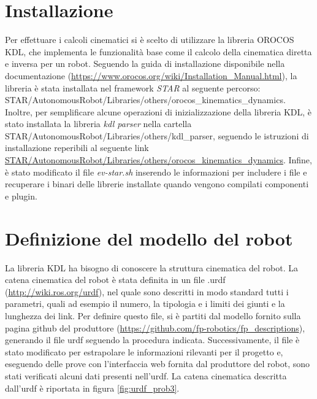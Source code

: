 \section{Installazione}
Per effettuare i calcoli cinematici si è scelto di utilizzare la libreria OROCOS KDL, che implementa le funzionalità base come il calcolo della cinematica diretta e inversa per un robot. Seguendo la guida di installazione disponibile nella documentazione (\url{https://www.orocos.org/wiki/Installation_Manual.html}), la libreria è stata installata nel framework \textit{STAR} al seguente percorso: STAR/AutonomousRobot/Libraries/others/orocos\_kinematics\_dynamics. Inoltre, per semplificare alcune operazioni di inizializzazione della libreria KDL, è stato installata la libreria \textit{kdl parser} nella cartella STAR/AutonomousRobot/Libraries/others/kdl\_parser, seguendo le istruzioni di installazione reperibili al seguente link \url{STAR/AutonomousRobot/Libraries/others/orocos\_kinematics\_dynamics}. Infine, è stato modificato il file \textit{ev-star.sh} inserendo le informazioni per includere i file e recuperare i binari delle librerie installate quando vengono compilati componenti e plugin.

\section{Definizione del modello del robot}
La libreria KDL ha bisogno di conoscere la struttura cinematica del robot. La catena cinematica del robot è stata definita in un file .urdf (\url{http://wiki.ros.org/urdf}), nel quale sono descritti in modo standard tutti i parametri, quali ad esempio il numero, la tipologia e i limiti dei giunti e la lunghezza dei link. Per definire questo file, si è partiti dal modello fornito sulla pagina github del produttore (\url{https://github.com/fp-robotics/fp_descriptions}), generando il file urdf seguendo la procedura indicata. Successivamente, il file è stato modificato per estrapolare le informazioni rilevanti per il progetto e, eseguendo delle prove con l'interfaccia web fornita dal produttore del robot, sono stati verificati alcuni dati presenti nell'urdf. La catena cinematica descritta dall'urdf è riportata in figura \ref{fig:urdf_prob3}.


